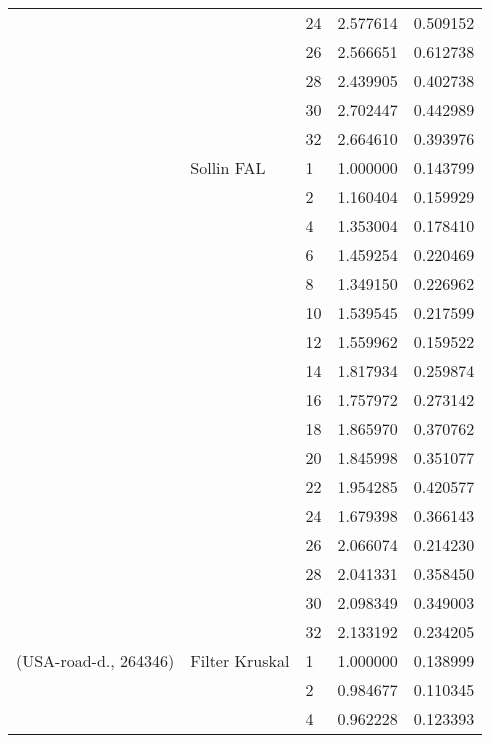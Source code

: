 \begin{tabular}{lllrr}
                      &            & 24 &  2.577614 &  0.509152 \\
                      &            & 26 &  2.566651 &  0.612738 \\
                      &            & 28 &  2.439905 &  0.402738 \\
                      &            & 30 &  2.702447 &  0.442989 \\
                      &            & 32 &  2.664610 &  0.393976 \\
                      & Sollin FAL & 1  &  1.000000 &  0.143799 \\
                      &            & 2  &  1.160404 &  0.159929 \\
                      &            & 4  &  1.353004 &  0.178410 \\
                      &            & 6  &  1.459254 &  0.220469 \\
                      &            & 8  &  1.349150 &  0.226962 \\
                      &            & 10 &  1.539545 &  0.217599 \\
                      &            & 12 &  1.559962 &  0.159522 \\
                      &            & 14 &  1.817934 &  0.259874 \\
                      &            & 16 &  1.757972 &  0.273142 \\
                      &            & 18 &  1.865970 &  0.370762 \\
                      &            & 20 &  1.845998 &  0.351077 \\
                      &            & 22 &  1.954285 &  0.420577 \\
                      &            & 24 &  1.679398 &  0.366143 \\
                      &            & 26 &  2.066074 &  0.214230 \\
                      &            & 28 &  2.041331 &  0.358450 \\
                      &            & 30 &  2.098349 &  0.349003 \\
                      &            & 32 &  2.133192 &  0.234205 \\
(USA-road-d., 264346) & Filter Kruskal & 1  &  1.000000 &  0.138999 \\
                      &            & 2  &  0.984677 &  0.110345 \\
                      &            & 4  &  0.962228 &  0.123393 \\

\end{tabular}
